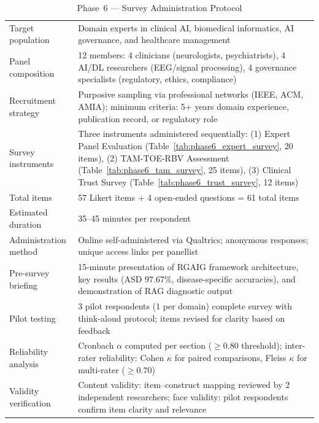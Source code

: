\begin{xltabular}{\textwidth}{@{} l X @{}}
\caption{Phase~6 --- Survey Administration Protocol}
\label{tab:phase6_admin}\\
\toprule
{} &  \\
\midrule
\endfirsthead
\endhead
\bottomrule
\endlastfoot
Target population        & Domain experts in clinical AI, biomedical informatics, AI governance, and healthcare management \\
\addlinespace
Panel composition        & 12 members: 4 clinicians (neurologists, psychiatrists), 4 AI/DL researchers (EEG/signal processing), 4 governance specialists (regulatory, ethics, compliance) \\
\addlinespace
Recruitment strategy     & Purposive sampling via professional networks (IEEE, ACM, AMIA); minimum criteria: 5+ years domain experience, publication record, or regulatory role \\
\addlinespace
Survey instruments       & Three instruments administered sequentially: (1) Expert Panel Evaluation (Table~\ref{tab:phase6_expert_survey}, 20 items), (2) TAM-TOE-RBV Assessment (Table~\ref{tab:phase6_tam_survey}, 25 items), (3) Clinical Trust Survey (Table~\ref{tab:phase6_trust_survey}, 12 items) \\
\addlinespace
Total items              & 57 Likert items + 4 open-ended questions = 61 total items \\
\addlinespace
Estimated duration       & 35--45 minutes per respondent \\
\addlinespace
Administration method    & Online self-administered via Qualtrics; anonymous responses; unique access links per panellist \\
\addlinespace
Pre-survey briefing      & 15-minute presentation of RGAIG framework architecture, key results (ASD 97.67\%, disease-specific accuracies), and demonstration of RAG diagnostic output \\
\addlinespace
Pilot testing            & 3 pilot respondents (1 per domain) complete survey with think-aloud protocol; items revised for clarity based on feedback \\
\addlinespace
Reliability analysis     & Cronbach $\alpha$ computed per section ($\geq 0.80$ threshold); inter-rater reliability: Cohen $\kappa$ for paired comparisons, Fleiss $\kappa$ for multi-rater ($\geq 0.70$) \\
\addlinespace
Validity verification    & Content validity: item--construct mapping reviewed by 2 independent researchers; face validity: pilot respondents confirm item clarity and relevance \\

\end{xltabular}
